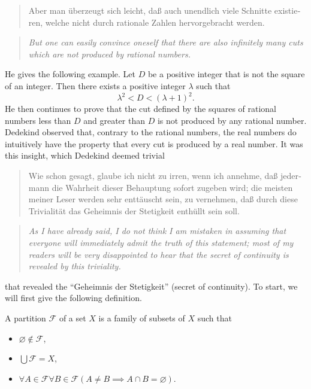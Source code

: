\documentclass[../main.tex]{subfiles}
\begin{document}
\begin{quote}
    \textgerman{Aber man überzeugt sich leicht, daß auch unendlich viele Schnitte existieren, welche nicht durch rationale Zahlen hervorgebracht werden.}
\end{quote}
\begin{quote}
    \textit{But one can easily convince oneself that there are also infinitely many cuts which are not produced by rational numbers.}
\end{quote}
He gives the following example. Let $D$ be a positive integer that is not the square of an integer. Then there exists a positive integer $\lambda$ such that
\begin{equation*}
    \lambda^2<D<(\lambda+1)^2.
\end{equation*}
He then continues to prove that the cut defined by the squares of rational numbers less than $D$ and greater than $D$ is not produced by any rational number. Dedekind observed that, contrary to the rational numbers, the real numbers do intuitively have the property that every cut is produced by a real number. It was this insight, which Dedekind deemed trivial
\begin{quote}
    \textgerman{Wie schon gesagt, glaube ich nicht zu irren, wenn ich annehme, daß jedermann die Wahrheit dieser Behauptung sofort zugeben wird; die meisten meiner Leser werden sehr enttäuscht sein, zu vernehmen, daß durch diese Trivialität das Geheimnis der Stetigkeit enthüllt sein soll.}
\end{quote}
\begin{quote}
    \textit{As I have already said, I do not think I am mistaken in assuming that everyone will immediately admit the truth of this statement; most of my readers will be very disappointed to hear that the secret of continuity is revealed by this triviality.}
\end{quote}
that revealed the ``\textgerman{Geheimnis der Stetigkeit}'' (secret of continuity). To start, we will first give the following definition.
\begin{definition}[Partition]
    A partition $\mathcal{F}$ of a set $X$ is a family of subsets of $X$ such that
    \begin{itemize}
        \item $\varnothing\notin\mathcal{F}$,
        \item $\bigcup\mathcal{F}=X$,
        \item $\forall A\in\mathcal{F}\forall B\in\mathcal{F}(A\neq B\implies A\cap B=\varnothing)$.
    \end{itemize}
\end{definition}
\end{document}
